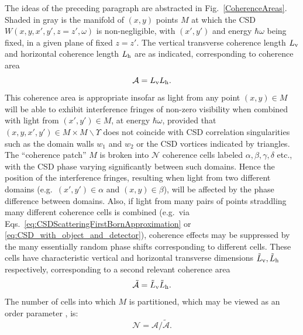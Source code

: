 \documentclass[%
 reprint,
 amsmath,amssymb,
 aps,
]{revtex4-1}
\begin{document}
The ideas of the preceding paragraph are abstracted in Fig.~\ref{CoherenceAreas}.  Shaded in gray is the manifold of $(x,y)$ points $M$ at which the CSD $W(x,y,x',y',z=z',\omega)$ is non-negligible, with $(x',y')$ and energy $\hbar\omega$ being fixed, in a given plane of fixed $z=z'$.  The vertical transverse coherence length $L_{\textrm v}$ and horizontal coherence length $L_{\textrm h}$ are as indicated, corresponding to coherence area
%
\begin{equation}
    \mathcal{A}=L_{\textrm v}L_{\textrm h}.
\end{equation}
%
This coherence area is appropriate insofar as light from any point $(x,y)\in M$ will be able to exhibit interference fringes of non-zero visibility when combined with light from $(x',y')\in M$, at energy $\hbar\omega$, provided that $(x,y,x',y')\in M \times M \backslash \Upsilon$ does not coincide with CSD correlation singularities such as the domain walls $w_1$ and $w_2$ or the CSD vortices indicated by triangles. The ``coherence patch'' $M$ is broken into $\mathcal{N}$ coherence cells labeled $\alpha,\beta,\gamma,\delta$ etc., with the CSD phase varying significantly between such domains.  Hence the position of the interference fringes, resulting when light from two different domains (e.g.~$(x',y')\in\alpha$ and $(x,y)\in\beta$), will be  affected by the phase difference between domains.  Also, if light from many pairs of points straddling many different coherence cells is combined (e.g.~via Eqs.~\ref{eq:CSDScatteringFirstBornApproximation} or  \ref{eq:CSD_with_object_and_detector}), coherence effects may be suppressed by the many essentially random phase shifts corresponding to different cells.  These cells have characteristic vertical and horizontal transverse dimensions $\tilde{L}_{\textrm v},\tilde{L}_{\textrm h}$ respectively, corresponding to a second relevant coherence area
%
\begin{equation}
    \tilde{\mathcal{A}}=\tilde{L}_{\textrm v} \tilde{L}_{\textrm h}.
\end{equation}
%
The number of cells into which $M$ is partitioned, which may be viewed as an order parameter \cite{SethnaBook}, is:
\begin{equation}
    \mathcal{N}=\mathcal{A}/\mathcal{\tilde{A}}.
\end{equation}
\end{document}
